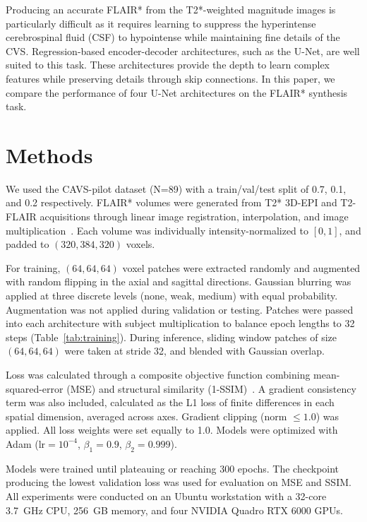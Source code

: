 \documentclass{article}
\begin{document}
Producing an accurate FLAIR* from the T2*-weighted magnitude images is
particularly difficult as it requires learning to suppress the hyperintense
cerebrospinal fluid (CSF) to hypointense while maintaining fine details of
the CVS. Regression-based encoder-decoder architectures, such as the U-Net,
are well suited to this task. These architectures provide the depth to learn
complex features while preserving details through skip connections. In this
paper, we compare the performance of four U-Net architectures on the FLAIR*
synthesis task.

\section{Methods}

We used the CAVS-pilot dataset (N=89) with a train/val/test split of 0.7,
0.1, and 0.2 respectively. FLAIR* volumes were generated from T2* 3D-EPI and
T2-FLAIR acquisitions through linear image registration, interpolation, and
image multiplication~\cite{sati2012flair}. Each volume was individually
intensity-normalized to $[0, 1]$, and padded to $(320, 384, 320)$ voxels.

For training, $(64, 64, 64)$ voxel patches were extracted randomly and
augmented with random flipping in the axial and sagittal directions. Gaussian
blurring was applied at three discrete levels (none, weak, medium) with equal
probability. Augmentation was not applied during validation or testing. Patches
were passed into each architecture with subject multiplication to balance
epoch lengths to 32 steps (Table~\ref{tab:training}). During inference,
sliding window patches of size $(64, 64, 64)$ were taken at stride 32, and
blended with Gaussian overlap.

Loss was calculated through a composite objective function combining
mean-squared-error (MSE) and structural similarity (1-SSIM)~\cite{wang2004ssim}.
A gradient consistency term was also included, calculated as the L1 loss of
finite differences in each spatial dimension, averaged across axes. Gradient
clipping (norm $\leq 1.0$) was applied. All loss weights were set equally to
1.0. Models were optimized with Adam ($\text{lr}=10^{-4}$, $\beta_1=0.9$,
$\beta_2=0.999$).

Models were trained until plateauing or reaching 300 epochs. The checkpoint
producing the lowest validation loss was used for evaluation on MSE and SSIM.
All experiments were conducted on an Ubuntu workstation with a 32-core
3.7~GHz CPU, 256~GB memory, and four NVIDIA Quadro RTX 6000 GPUs.
\end{document}
